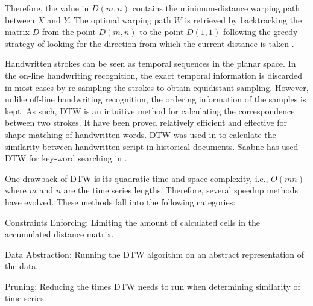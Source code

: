 Therefore, the value in $D(m,n)$ contains the minimum-distance warping path between $X$ and $Y$.
The optimal warping path $W$ is retrieved by backtracking the matrix $D$ from the point $D(m,n)$ to the point $D(1,1)$ following the greedy strategy of looking for the direction from which the current distance is taken \cite{senin2008dynamic}.

\iftoggle{edit-mode}{\hspace{0pt}\marginpar{stroke trajectories similarity measure using DTW}}{}
Handwritten strokes can be seen as temporal sequences in the planar space. In the on-line handwriting recognition, the exact temporal information is discarded in most cases by re-sampling the strokes to obtain equidistant sampling. However, unlike off-line handwriting recognition, the ordering information of the samples is kept. As such, DTW is an intuitive method for calculating the correspondence between two strokes. 
It have been proved relatively efficient and effective for shape matching of handwritten words. DTW was used in \cite{rath2003word, rath2003indexing, moghaddam2009application} to calculate the similarity between handwritten script in historical documents. Saabne has used DTW for key-word searching in \cite{saabni2011fast, saabni2008keyword}.

\iftoggle{edit-mode}{\hspace{0pt}\marginpar{DTW Speedup}}{}
One drawback of DTW is its quadratic time and space complexity, i.e., $O(mn)$ where $m$ and $n$ are the time series lengths. Therefore, several speedup methods have evolved. These methods fall into the following categories:
\begin{compactitem}
\item Constraints Enforcing: Limiting the amount of calculated cells in the accumulated distance matrix.
\item Data Abstraction: Running the DTW algorithm on an abstract representation of the data.
\item Pruning: Reducing the times DTW needs to run when determining similarity of time series.
\end{compactitem}

